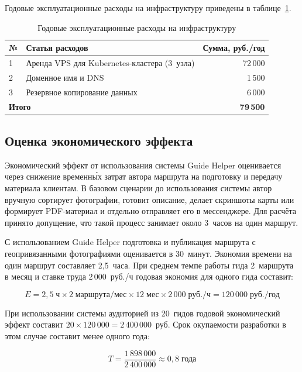 Годовые эксплуатационные расходы на инфраструктуру приведены в
таблице~\ref{tab:infra}.

\begin{table}[H]
\caption{Годовые эксплуатационные расходы на инфраструктуру}
\label{tab:infra}
\begin{tabularx}{\textwidth}{|l|X|r|}
\hline
\textbf{№} & \textbf{Статья расходов} & \textbf{Сумма, руб./год} \\
\hline
1 & Аренда VPS для Kubernetes-кластера (3~узла) & 72\,000 \\
\hline
2 & Доменное имя и DNS & 1\,500 \\
\hline
3 & Резервное копирование данных & 6\,000 \\
\hline
\multicolumn{2}{|l|}{\textbf{Итого}} & \textbf{79\,500} \\
\hline
\end{tabularx}
\end{table}

\subsection{Оценка экономического эффекта}

Экономический эффект от использования системы Guide Helper оценивается через
снижение временны́х затрат автора маршрута на подготовку и передачу материала
клиентам. В базовом сценарии до использования системы автор вручную сортирует
фотографии, готовит описание, делает скриншоты карты или формирует PDF-материал
и отдельно отправляет его в мессенджере. Для расчёта принято допущение, что такой
процесс занимает около 3~часов на один маршрут.

С использованием Guide Helper подготовка и публикация маршрута с геопривязанными
фотографиями оценивается в 30~минут. Экономия времени на один маршрут составляет
2,5~часа. При среднем темпе работы гида 2~маршрута в месяц и ставке труда
2\,000~руб./ч годовая экономия для одного гида составит:

\[
  E = 2{,}5 \; \text{ч} \times 2 \; \text{маршрута/мес} \times 12 \; \text{мес}
      \times 2\,000 \; \text{руб./ч} = 120\,000 \; \text{руб./год}
\]

При использовании системы аудиторией из 20~гидов годовой экономический эффект
составит $20 \times 120\,000 = 2\,400\,000$~руб. Срок окупаемости разработки в
этом случае составит менее одного года:

\[
  T = \frac{1\,898\,000}{2\,400\,000} \approx 0{,}8 \; \text{года}
\]

